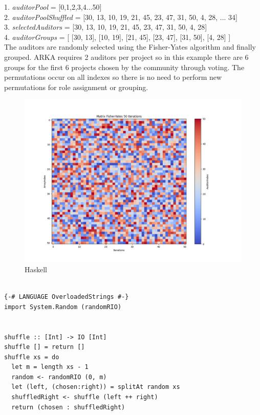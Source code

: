 \documentclass[12pt]{article}
\begin{document}
1. \emph {auditorPool } = [0,1,2,3,4...50] \\
2. \emph {auditorPoolShuffled } = [30, 13, 10, 19, 21, 45, 23, 47, 31, 50,  4, 28, ... 34]\\
3. \emph {selectedAuditors} = [30, 13, 10, 19, 21, 45, 23, 47, 31, 50,  4, 28]\\
4. \emph {auditorGroups } = [ [30, 13], [10, 19], [21, 45], [23, 47], [31, 50],  [4, 28] ]\\

The auditors are randomly selected using the Fisher-Yates algorithm and finally grouped. ARKA requires 2 auditors per project so in this example there are 6 groups for the first 6 projects chosen by the community through voting. The permutations occur on all indexes so there is no need to perform new permutations for role assignment or grouping.


\begin{figure}[ht]
  \centering
  \includegraphics[width=1\textwidth]{haskell-matrix.png}
  \caption{Haskell
  }
  \label{fig:haskell-matrix}
\end{figure}


\begin{tcolorbox}[title=Haskell Code]
\begin{verbatim}

{-# LANGUAGE OverloadedStrings #-}
import System.Random (randomRIO)


shuffle :: [Int] -> IO [Int]
shuffle [] = return []
shuffle xs = do
  let m = length xs - 1
  random <- randomRIO (0, m)
  let (left, (chosen:right)) = splitAt random xs
  shuffledRight <- shuffle (left ++ right)
  return (chosen : shuffledRight)


\end{verbatim}
\end{tcolorbox}
\end{document}
